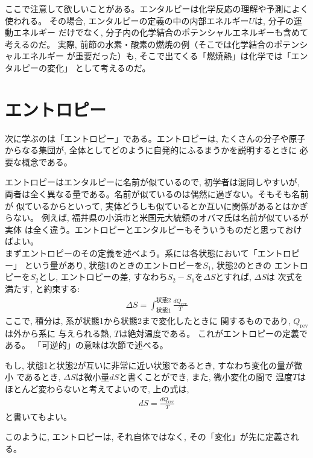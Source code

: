 ここで注意して欲しいことがある。エンタルピーは化学反応の理解や予測によく使われる。
その場合, エンタルピーの定義の中の内部エネルギー$U$は, 分子の運動エネルギー
だけでなく, 分子内の化学結合のポテンシャルエネルギーも含めて考えるのだ。
実際, 前節の水素・酸素の燃焼の例（そこでは化学結合のポテンシャルエネルギー
が重要だった）も, そこで出てくる「燃焼熱」は化学では「エンタルピーの変化」
として考えるのだ。
\mv

\section{エントロピー}

次に学ぶのは「エントロピー」である。エントロピーは, たくさんの分子や原子
からなる集団が, 全体としてどのように自発的にふるまうかを説明するときに
必要な概念である。

エントロピーはエンタルピーに名前が似ているので, 初学者は混同しやすいが, 
両者は全く異なる量である。名前が似ているのは偶然に過ぎない。そもそも名前が
似ているからといって, 実体どうしも似ているとか互いに関係があるとはかぎらない。
例えば, 福井県の小浜市と米国元大統領のオバマ氏は名前が似ているが実体
は全く違う。エントロピーとエンタルピーもそういうものだと思っておけばよい。\\

まずエントロピーのその定義を述べよう。系には各状態において「エントロピー」
という量があり, 状態1のときのエントロピーを$S_1$, 状態2のときの
エントロピーを$S_2$とし, 
エントロピーの差, すなわち$S_2-S_1$を$\Delta S$とすれば, $\Delta S$は
次式を満たす, と約束する: 
\begin{eqnarray}
\Delta S=\int_{\text{状態1}}^{\text{状態2}} \frac{dQ_{\text{rev}}}{T}\label{eq:def_entropy}
\end{eqnarray}
ここで, 積分は, 系が状態1から状態2まで変化したときに
関するものであり, $Q_{\text{rev}}$は外から系に
与えられる熱, $T$は絶対温度である。 これがエントロピーの定義である。
「可逆的」の意味は次節で述べる。

もし, 状態1と状態2が互いに非常に近い状態であるとき, すなわち変化の量が微小
であるとき, $\Delta S$は微小量$dS$と書くことができ, また, 微小変化の間で
温度$T$はほとんど変わらないと考えてよいので, 上の式は, 
\begin{eqnarray}
dS=\frac{dQ_{\text{rev}}}{T}\label{eq:def_entropy2}
\end{eqnarray}
と書いてもよい。

このように, エントロピーは, それ自体ではなく, その「変化」が先に定義される。

